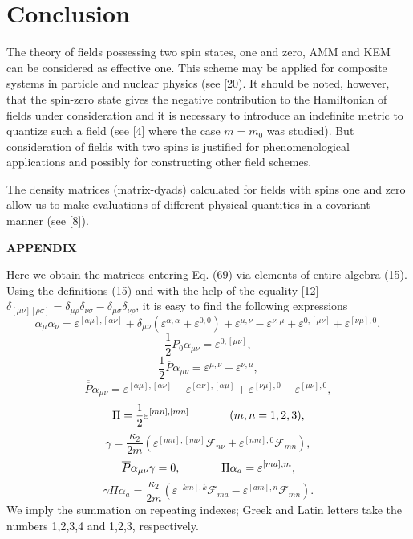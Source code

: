 \documentclass[a4paper,12pt]{article}
\begin{document}
\section{Conclusion}

The theory of fields possessing two spin states, one and zero, AMM
and KEM can be considered as effective one. This scheme may be
applied for composite systems in particle and nuclear physics (see
[20). It should be noted, however, that the spin-zero state gives
the negative contribution to the Hamiltonian of fields under
consideration and it is necessary to introduce an indefinite
metric to quantize such a field (see [4] where the case $m=m_0$
was studied). But consideration of fields with two spins is
justified for phenomenological applications and possibly for
constructing other field schemes.

The density matrices (matrix-dyads) calculated for fields with
spins one and zero allow us to make evaluations of different
physical quantities in a covariant manner (see [8]).

\begin{center}
{\bf APPENDIX}
\end{center}

Here we obtain the matrices entering Eq. (69) via elements of
entire algebra (15). Using the definitions (15) and with the help
of the equality [12] $\delta _{[\mu \nu ][\rho \sigma ]}=\delta
_{\mu \rho }\delta _{\nu \sigma }-\delta _{\mu \sigma }\delta
_{\nu \rho }$, it is easy to find the following expressions
\[
\alpha_\mu\alpha_\nu=\varepsilon^{[\alpha\mu],[\alpha\nu]}+\delta_{\mu\nu}
\left(\varepsilon^{\alpha,\alpha}+\varepsilon^{0,0}\right)+
\varepsilon^{\mu,\nu}-\varepsilon^{\nu,\mu}
+\varepsilon^{0,[\mu\nu]}+\varepsilon^{[\nu\mu],0},
\]
\[
\frac12P_0\alpha_{\mu\nu}=\varepsilon^{0,[\mu\nu]},
\]
\[
\frac12\overline{P}\alpha_{\mu\nu}=
\varepsilon^{\mu,\nu}-\varepsilon^{\nu,\mu},
\]
\[
\overline{\overline{P}}\alpha_{\mu\nu}=\varepsilon^{[\alpha\mu],[\alpha\nu]}
-\varepsilon^{[\alpha\nu],[\alpha\mu]}+\varepsilon^{[\nu\mu],0}-
\varepsilon^{[\mu\nu],0},
\]
\[
\Pi=\frac12 \varepsilon^{[mn],[mn]}\hspace{0.5in}(m,n=1,2,3),
\]
\[
\gamma=\frac{\kappa_2}{2m}\left(\varepsilon^{[mn],[m\nu]}\mathcal{F}_{n\nu}+
\varepsilon^{[nm],0}\mathcal{F}_{mn}\right),
\]
\[
\overline{P}\alpha_{\mu\nu}\gamma=0,\hspace{0.5in}\Pi\alpha_a=
\varepsilon^{[ma],m},
\]
\[
\gamma\Pi\alpha_a=\frac{\kappa_2}{2m}\left(\varepsilon^{[km],k}
\mathcal{F}_{ma}-\varepsilon^{[am],n}\mathcal{F}_{mn}\right).
\]
We imply the summation on repeating indexes; Greek and Latin
letters take the numbers 1,2,3,4 and 1,2,3, respectively.
\end{document}
